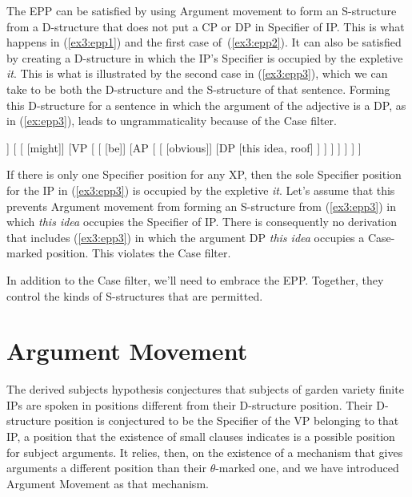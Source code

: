 The EPP can be satisfied by using Argument movement to form an S-structure from a D-structure that does not put a CP or DP in Specifier of IP. This is what happens in (\ref{ex3:epp1}) and the first case of~(\ref{ex3:epp2}). It can also be satisfied by creating a D-structure in which the IP's Specifier is occupied by the expletive \emph{it}. This is what is illustrated by the second case in (\ref{ex3:epp3}), which we can take to be both the D-structure and the S-structure of that sentence. Forming this D-structure for a sentence in which the argument of the adjective is a DP, as in (\ref{ex:epp3}), leads to ungrammaticality because of the Case filter.
\begin{exe}
\raggedright
	\ex \label{ex3:epp3}
	\small
	\begin{forest}
	[IP
		[DP [it, roof] ]
		[
			[ [might]]
			[VP [
				[ [be]]
				[AP [
					[ [obvious]]
					[DP [this idea, roof] ]
				] ]
			] ]
		 ]
	]
	\end{forest}
\end{exe}
If there is only one Specifier position for any XP, then the sole Specifier position for the IP in (\ref{ex3:epp3}) is occupied by the expletive \emph{it}. Let's assume that this prevents Argument movement from forming an S-structure from (\ref{ex3:epp3}) in which \emph{this idea} occupies the Specifier of IP. There is consequently no derivation that includes (\ref{ex3:epp3}) in which the argument DP \emph{this idea} occupies a Case-marked position. This violates the Case filter.

In addition to the Case filter, we'll need to embrace the EPP. Together, they control the kinds of S-structures that are permitted.

\section{Argument Movement}
\label{sec:argmove}

The derived subjects hypothesis conjectures that subjects of garden variety finite IPs are spoken in positions different from their D-structure position. Their D-structure position is conjectured to be the Specifier of the VP belonging to that IP, a position that the existence of small clauses indicates is a possible position for subject arguments. It relies, then, on the existence of a mechanism that gives arguments a different position than their \mbox{$\theta$-marked} one, and we have introduced Argument Movement as that mechanism.

